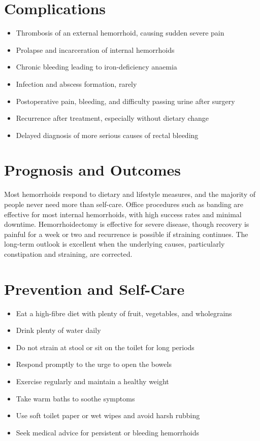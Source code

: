\section*{Complications}
\begin{itemize}
    \item Thrombosis of an external hemorrhoid, causing sudden severe pain
    \item Prolapse and incarceration of internal hemorrhoids
    \item Chronic bleeding leading to iron-deficiency anaemia
    \item Infection and abscess formation, rarely
    \item Postoperative pain, bleeding, and difficulty passing urine after surgery
    \item Recurrence after treatment, especially without dietary change
    \item Delayed diagnosis of more serious causes of rectal bleeding
\end{itemize}

\section*{Prognosis and Outcomes}
Most hemorrhoids respond to dietary and lifestyle measures, and the majority of people never need more than self-care. Office procedures such as banding are effective for most internal hemorrhoids, with high success rates and minimal downtime. Hemorrhoidectomy is effective for severe disease, though recovery is painful for a week or two and recurrence is possible if straining continues. The long-term outlook is excellent when the underlying causes, particularly constipation and straining, are corrected.

\section*{Prevention and Self-Care}
\begin{itemize}
    \item Eat a high-fibre diet with plenty of fruit, vegetables, and wholegrains
    \item Drink plenty of water daily
    \item Do not strain at stool or sit on the toilet for long periods
    \item Respond promptly to the urge to open the bowels
    \item Exercise regularly and maintain a healthy weight
    \item Take warm baths to soothe symptoms
    \item Use soft toilet paper or wet wipes and avoid harsh rubbing
    \item Seek medical advice for persistent or bleeding hemorrhoids
\end{itemize}


